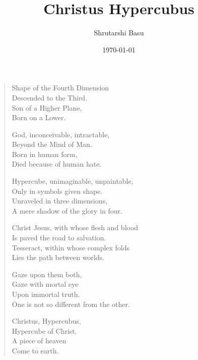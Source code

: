 \documentclass[11pt,letterpaper]{article}
\title{Christus Hypercubus}
\author{Shrutarshi Basu}
\date{\today}
\begin{document}
\maketitle
\begin{verse}
Shape of the Fourth Dimension\\
Descended to the Third.\\
Son of a Higher Plane,\\
Born on a Lower.

God, inconceivable, intractable,\\
Beyond the Mind of Man.\\
Born in human form,\\
Died because of human hate.

Hypercube, unimaginable, unpaintable,\\
Only in symbols given shape.\\
Unraveled in three dimensions,\\
A mere shadow of the glory in four.

Christ Jesus, with whose flesh and blood\\
Is paved the road to salvation.\\
Tesseract, within whose complex folds\\
Lies the path between worlds.

Gaze upon them both,\\
Gaze with mortal eye\\
Upon immortal truth.\\
One is not so different from the other.

Christus, Hypercubus,\\
Hypercube of Christ.\\
A piece of heaven\\
Come to earth.
\end{verse}

\end{document}
